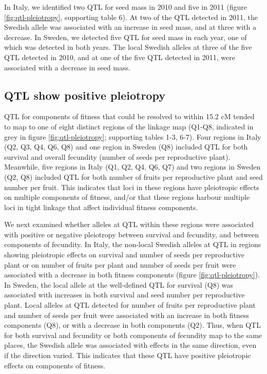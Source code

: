 \documentclass[]{article}
\begin{document}
In Italy, we identified two QTL for seed mass in 2010 and five in 2011 (figure \ref{fig:qtl-pleiotropy}, supporting table 6).
At two of the QTL detected in 2011, the Swedish allele was associated with an increase in seed mass, and at three with a decrease. In Sweden, we detected five QTL for seed mass in each year, one of which was detected in both years. The local Swedish alleles at three of the five QTL detected in 2010, and at one of the five QTL detected in 2011, were associated with a decrease in seed mass.

\hypertarget{qtl-show-positive-pleiotropy}{%
\subsection{QTL show positive pleiotropy}\label{qtl-show-positive-pleiotropy}}

QTL for components of fitness that could be resolved to within 15.2 cM tended to map to one of eight distinct regions of the linkage map (Q1-Q8, indicated in grey in figure \ref{fig:qtl-pleiotropy}; supporting tables 1-3, 6-7).
Four regions in Italy (Q2, Q3, Q4, Q6, Q8) and one region in Sweden (Q8) included QTL for both survival and overall fecundity (number of seeds per reproductive plant).
Meanwhile, five regions in Italy (Q1, Q2, Q4, Q6, Q7) and two regions in Sweden (Q2, Q8) included QTL for both number of fruits per reproductive plant and seed number per fruit.
This indicates that loci in these regions have pleiotropic effects on multiple components of fitness, and/or that these regions harbour multiple loci in tight linkage that affect individual fitness components.

We next examined whether alleles at QTL within these regions were associated with positive or negative pleiotropy between survival and fecundity, and between components of fecundity.
In Italy, the non-local Swedish alleles at QTL in regions showing pleiotropic effects on survival and number of seeds per reproductive plant or on number of fruits per plant and number of seeds per fruit were associated with a decrease in both fitness components (figure \ref{fig:qtl-pleiotropy}).
In Sweden, the local allele at the well-defined QTL for survival (Q8) was associated with increases in both survival and seed number per reproductive plant.
Local alleles at QTL detected for number of fruits per reproductive plant and number of seeds per fruit were associated with an increase in both fitness components (Q8), or with a decrease in both components (Q2).
Thus, when QTL for both survival and fecundity or both components of fecundity map to the same places, the Swedish allele was associated with effects in the same direction, even if the direction varied.
This indicates that these QTL have positive pleiotropic effects on components of fitness.
\end{document}
